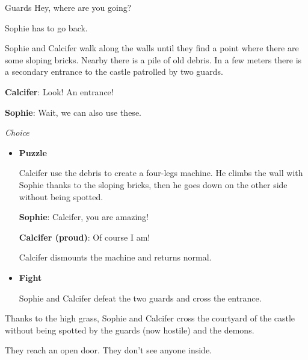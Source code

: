 \begin{screenplay}

\begin{dialogue}{Guards}
Hey, where are you going?
\end{dialogue}

Sophie has to go back.

\end{screenplay}
\vspace{1em}


Sophie and Calcifer walk along the walls until they find a point where there are some sloping bricks. Nearby there is a pile of old debris.
In a few meters there is a secondary entrance to the castle patrolled by two guards.

\textbf{Calcifer}: Look! An entrance!

\textbf{Sophie}: Wait, we can also use these.

\textit{Choice}
\begin{itemize}
  \item \textbf{Puzzle}
  
  Calcifer use the debris to create a four-legs machine. He climbs the wall with Sophie thanks to the sloping bricks, then he goes down on the other side without being spotted.
  
  \textbf{Sophie}: Calcifer, you are amazing!
  
  \textbf{Calcifer (proud)}: Of course I am!

  Calcifer dismounts the machine and returns normal.

  \item \textbf{Fight}
    
  Sophie and Calcifer defeat the two guards and cross the entrance.
\end{itemize}


Thanks to the high grass, Sophie and Calcifer cross the courtyard of the castle without being spotted by the guards (now hostile) and the demons.

They reach an open door. They don’t see anyone inside.

